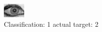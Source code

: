 \begin{figure}[h!]
\begin{center}
\includegraphics[width=0.60\columnwidth]{figures/ID2030_class_1_target_2.png}
\end{center}
\caption{ Classification: 1 actual target: 2}
\label{fig:ID2030_class_1_target_2}
\end{figure}
